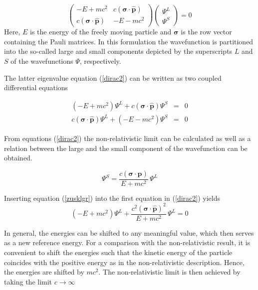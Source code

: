 \begin{equation}\label{dirac2}
\left(\begin{array}{cc}
-E +mc^2 & c(\boldsymbol{\sigma}\cdot\hat{\mathbf{p}})\\
c(\boldsymbol{\sigma}\cdot\hat{\mathbf{p}}) & -E-mc^2
\end{array}\right)
\begin{pmatrix}\Psi^L\\\Psi^S\end{pmatrix}
=0
\end{equation}
Here, $E$ is the energy of the freely moving particle
and $\boldsymbol{\sigma}$ is the row vector
containing the Pauli matrices. In this formulation the wavefunction is partitioned
into the so-called large and small components depicted by the superscripts $L$ and
$S$ of the wavefunctions $\Psi$, respectively.

The latter eigenvalue equation (\ref{dirac2}) can be written as two coupled
differential equations

\begin{equation}\begin{array}{rcl}
(-E+mc^2)\Psi^L + c(\boldsymbol{\sigma}\cdot\hat{\mathbf{p}}) \Psi^S &=& 0\\
c(\boldsymbol{\sigma}\cdot\hat{\mathbf{p}}) \Psi^L +(-E-mc^2)\Psi^S &=& 0
\end{array}\end{equation}

From equations (\ref{dirac2}) the non-relativistic limit can be calculated 
as well as
a relation between the large and the small component of the
wavefunction can be obtained.

\begin{equation}\label{zusklgr}
\Psi^S = \frac{c(\mathbf{\sigma}\cdot\hat{\mathbf{p}})}{E+mc^2}\,\Psi^L
\end{equation}

Inserting equation (\ref{zusklgr}) into the first equation in (\ref{dirac2})
yields
\begin{equation}
(-E+mc^2)\Psi^L + \frac{c^2(\mathbf{\sigma}\cdot\hat{\mathbf{p}})^2}{E+mc^2}\,\Psi^L = 0
\end{equation}

In general, the energies can be shifted to any meaningful value, which then
serves as a new reference energy. For a comparison with the non-relativistic result,
it is convenient to shift the energies such
that the kinetic energy of the particle coincides with the positive energy as
in the non-relativistic description. Hence, the energies are shifted by $mc^2$.
The non-relativistic limit is then achieved by taking the limit $c\to \infty$

